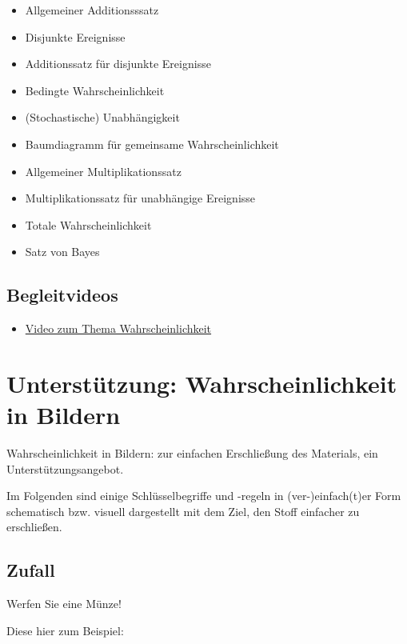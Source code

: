 \documentclass[
  a4paper,
  DIV=11]{scrreprt}
\providecommand{\tightlist}{%
  \setlength{\itemsep}{0pt}\setlength{\parskip}{0pt}}\usepackage{longtable,booktabs,array}
\theoremstyle{definition}
\theoremstyle{remark}
\begin{document}
\begin{itemize}
\tightlist
\item
  Allgemeiner Additionsssatz
\item
  Disjunkte Ereignisse
\item
  Additionssatz für disjunkte Ereignisse
\item
  Bedingte Wahrscheinlichkeit
\item
  (Stochastische) Unabhängigkeit
\item
  Baumdiagramm für gemeinsame Wahrscheinlichkeit
\item
  Allgemeiner Multiplikationssatz
\item
  Multiplikationssatz für unabhängige Ereignisse
\item
  Totale Wahrscheinlichkeit
\item
  Satz von Bayes
\end{itemize}

\hypertarget{begleitvideos-1}{%
\subsection{Begleitvideos}\label{begleitvideos-1}}

\begin{itemize}
\tightlist
\item
  \href{https://youtu.be/rR6NspapEyo}{Video zum Thema
  Wahrscheinlichkeit}
\end{itemize}

\hypertarget{unterstuxfctzung-wahrscheinlichkeit-in-bildern}{%
\section{Unterstützung: Wahrscheinlichkeit in
Bildern}\label{unterstuxfctzung-wahrscheinlichkeit-in-bildern}}

Wahrscheinlichkeit in Bildern: zur einfachen Erschließung des Materials,
ein Unterstützungsangebot.

Im Folgenden sind einige Schlüsselbegriffe und -regeln in
(ver-)einfach(t)er Form schematisch bzw. visuell dargestellt mit dem
Ziel, den Stoff einfacher zu erschließen.

\hypertarget{zufall}{%
\subsection{Zufall}\label{zufall}}

Werfen Sie eine Münze!

Diese hier zum Beispiel:
\end{document}
